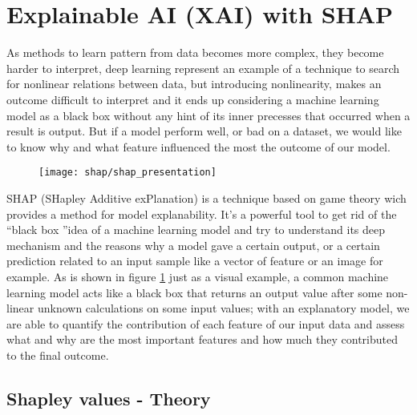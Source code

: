 \documentclass[a4paper,11pt]{article}
\begin{document}
\newpage

\section{Explainable AI (XAI) with SHAP}

As methods to learn pattern from data becomes more complex, they become harder to interpret, deep learning represent an example of a technique to search for nonlinear relations between data, but introducing nonlinearity, makes an outcome difficult to interpret and it ends up considering a machine learning model as a black box without any hint of its inner precesses that occurred when a result is output. But if a model perform well, or bad on a dataset, we would like to know why and what feature influenced the most the outcome of our model.


\begin{figure}[h]
\centering
\texttt{[image: shap/shap\_presentation]}
\caption{}\label{fig:shap_waterfall}
\end{figure}


SHAP (SHapley Additive exPlanation) is a technique based on game theory wich provides a method for model explanability.
It's a powerful tool to get rid of the \textquotedblleft black box \textquotedblright idea of a machine learning model and try to understand its deep mechanism and the reasons why a model gave a certain output, or a certain prediction related to an input sample like a vector of feature or an image for example.
As is shown in figure \ref{fig:shap_waterfall} just as a visual example, a common machine learning model acts like a black box that returns an output value after some non-linear unknown calculations on some input values; with an explanatory model, we are able to quantify the contribution of each feature of our input data and assess what and why are the most important features and how much they contributed to the final outcome.




\subsection{Shapley values - Theory}
\end{document}
